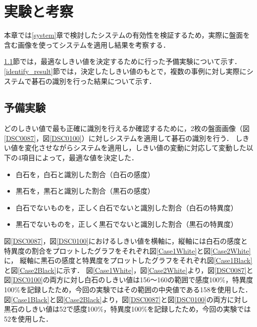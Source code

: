 \documentclass[openright]{nitocs}
\numberwithin{equation}{section}
\begin{document}
    \section{実験と考察} %
        本章では\ref{system}章で検討したシステムの有効性を検証するため，実際に盤面を含む画像を使ってシステムを適用し結果を考察する．

        \ref{threshold}節では，最適なしきい値を決定するために行った予備実験について示す．
        \ref{identify_result}節では，決定したしきい値のもとで，複数の事例に対し実際にシステムで碁石の識別を行った結果について示す．

        \subsection{予備実験} \label{threshold}
            どのしきい値で最も正確に識別を行えるか確認するために，2枚の盤面画像（図\ref{DSC0087}，図\ref{DSC0100}）に対しシステムを適用して碁石の識別を行う．
            しきい値を変化させながらシステムを適用し，しきい値の変動に対応して変動した以下の4項目によって，最適な値を決定した．
            \begin{itemize}
                \item 白石を，白石と識別した割合（白石の感度）
                \item 黒石を，黒石と識別した割合（黒石の感度）
                \item 白石でないものを，正しく白石でないと識別した割合（白石の特異度）
                \item 黒石でないものを，正しく黒石でないと識別した割合（黒石の特異度）
            \end{itemize}

            図\ref{DSC0087}，図\ref{DSC0100}におけるしきい値を横軸に，縦軸には白石の感度と特異度の割合をプロットしたグラフをそれぞれ図\ref{Case1White}と図\ref{Case2White}に，
            縦軸に黒石の感度と特異度をプロットしたグラフをそれぞれ図\ref{Case1Black}と図\ref{Case2Black}に示す．
            図\ref{Case1White}，図\ref{Case2White}より，図\ref{DSC0087}と図\ref{DSC0100}の両方に対し白石のしきい値は156～160の範囲で感度100\%，特異度100\%を記録したため，今回の実験ではその範囲の中央値である158を使用した．
            図\ref{Case1Black}と図\ref{Case2Black}より，図\ref{DSC0087}と図\ref{DSC0100}の両方に対し黒石のしきい値は52で感度100\%，特異度100\%を記録したため，今回の実験では52を使用した．
\end{document}
